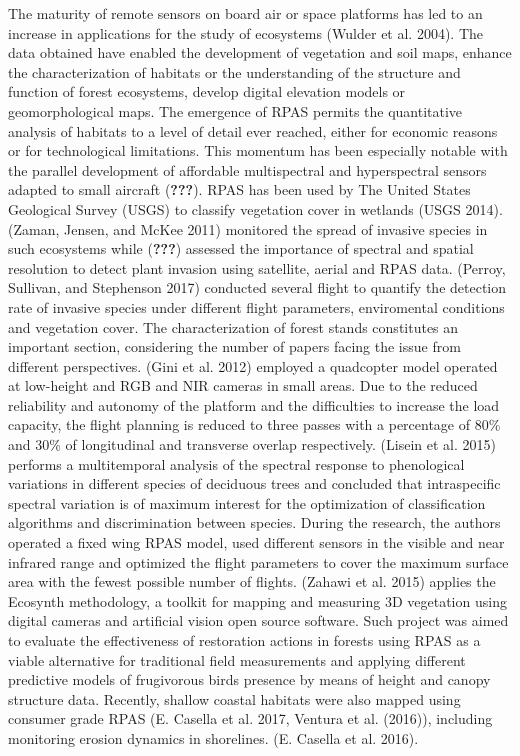 \documentclass[]{interact}
\theoremstyle{plain}%
\theoremstyle{definition}
\theoremstyle{remark}
\begin{document}
The maturity of remote sensors on board air or space platforms has led
to an increase in applications for the study of ecosystems (Wulder et
al. 2004). The data obtained have enabled the development of vegetation
and soil maps, enhance the characterization of habitats or the
understanding of the structure and function of forest ecosystems,
develop digital elevation models or geomorphological maps. The emergence
of RPAS permits the quantitative analysis of habitats to a level of
detail ever reached, either for economic reasons or for technological
limitations. This momentum has been especially notable with the parallel
development of affordable multispectral and hyperspectral sensors
adapted to small aircraft ({\textbf{???}}). RPAS has been used by The
United States Geological Survey (USGS) to classify vegetation cover in
wetlands (USGS 2014). (Zaman, Jensen, and McKee 2011) monitored the
spread of invasive species in such ecosystems while ({\textbf{???}})
assessed the importance of spectral and spatial resolution to detect
plant invasion using satellite, aerial and RPAS data. (Perroy, Sullivan,
and Stephenson 2017) conducted several flight to quantify the detection
rate of invasive species under different flight parameters, enviromental
conditions and vegetation cover. The characterization of forest stands
constitutes an important section, considering the number of papers
facing the issue from different perspectives. (Gini et al. 2012)
employed a quadcopter model operated at low-height and RGB and NIR
cameras in small areas. Due to the reduced reliability and autonomy of
the platform and the difficulties to increase the load capacity, the
flight planning is reduced to three passes with a percentage of 80\% and
30\% of longitudinal and transverse overlap respectively. (Lisein et al.
2015) performs a multitemporal analysis of the spectral response to
phenological variations in different species of deciduous trees and
concluded that intraspecific spectral variation is of maximum interest
for the optimization of classification algorithms and discrimination
between species. During the research, the authors operated a fixed wing
RPAS model, used different sensors in the visible and near infrared
range and optimized the flight parameters to cover the maximum surface
area with the fewest possible number of flights. (Zahawi et al. 2015)
applies the Ecosynth methodology, a toolkit for mapping and measuring 3D
vegetation using digital cameras and artificial vision open source
software. Such project was aimed to evaluate the effectiveness of
restoration actions in forests using RPAS as a viable alternative for
traditional field measurements and applying different predictive models
of frugivorous birds presence by means of height and canopy structure
data. Recently, shallow coastal habitats were also mapped using consumer
grade RPAS (E. Casella et al. 2017, Ventura et al. (2016)), including
monitoring erosion dynamics in shorelines. (E. Casella et al. 2016).
\end{document}
